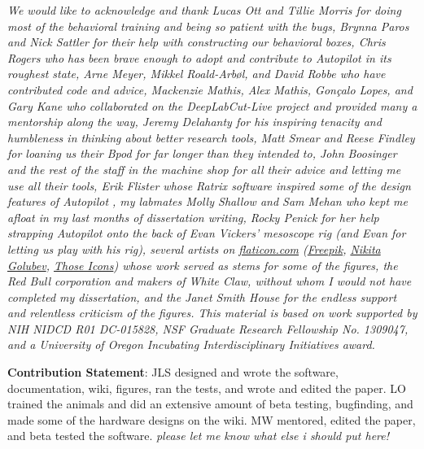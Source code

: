 
\begin{acknowledgements}
\textit{We would like to acknowledge and thank Lucas Ott and Tillie Morris for doing most of the behavioral training and being so patient with the bugs, Brynna Paros and Nick Sattler for their help with constructing our behavioral boxes, Chris Rogers who has been brave enough to adopt and contribute to Autopilot in its roughest state, Arne Meyer, Mikkel Roald-Arbøl, and David Robbe who have contributed code and advice, Mackenzie Mathis, Alex Mathis, Gonçalo Lopes, and Gary Kane who collaborated on the DeepLabCut-Live project and provided many a mentorship along the way, Jeremy Delahanty for his inspiring tenacity and humbleness in thinking about better research tools, Matt Smear and Reese Findley for loaning us their Bpod for far longer than they intended to, John Boosinger and the rest of the staff in the machine shop for all their advice and letting me use all their tools, Erik Flister whose Ratrix software inspired some of the design features of Autopilot \citep{meierCollinearFeaturesImpair2011}, my labmates Molly Shallow and Sam Mehan who kept me afloat in my last months of dissertation writing, Rocky Penick for her help strapping Autopilot onto the back of Evan Vickers' mesoscope rig (and Evan for letting us play with his rig), several artists on \url{flaticon.com} (\href{https://www.flaticon.com/authors/freepik}{Freepik}, \href{https://www.flaticon.com/authors/nikita-golubev}{Nikita Golubev}, \href{https://www.flaticon.com/authors/those-icons}{Those Icons}) whose work served as stems for some of the figures, the Red Bull corporation and makers of White Claw, without whom I would not have completed my dissertation, and the Janet Smith House for the endless support and relentless criticism of the figures. This material is based on work supported by NIH NIDCD R01 DC-015828, NSF Graduate Research Fellowship No. 1309047, and a University of Oregon Incubating Interdisciplinary Initiatives award.}

\textbf{Contribution Statement}: JLS designed and wrote the software, documentation, wiki, figures, ran the tests, and wrote and edited the paper. LO trained the animals and did an extensive amount of beta testing, bugfinding, and made some of the hardware designs on the wiki. MW mentored, edited the paper, and beta tested the software. \textit{please let me know what else i should put here!}

\end{acknowledgements}